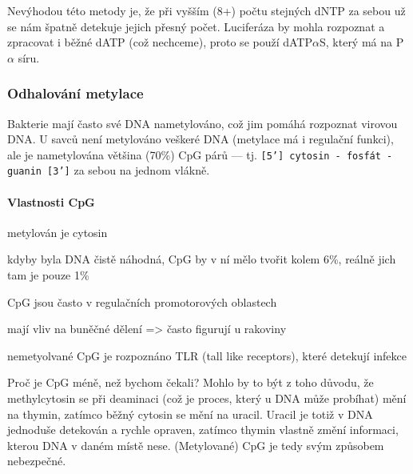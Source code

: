 \documentclass[DIV=8]{scrreprt}
\newcommand{\inlinecode}{\texttt}
\begin{document}
Nevýhodou této metody je, že při vyšším (8+) počtu stejných dNTP za sebou už se nám špatně detekuje jejich přesný počet. Luciferáza by mohla rozpoznat a zpracovat i běžné dATP (což nechceme), proto se použí dATP\(\alpha\)S, který má na P\(\alpha\) síru.

\subsubsection{Odhalování metylace} \label{Odhalování metylace}


Bakterie mají často své DNA nametylováno, což jim pomáhá rozpoznat virovou DNA. U savců není metylováno veškeré DNA (metylace má i regulační funkci), ale je nametylována většina (70\%) CpG párů --- tj. \inlinecode{[5'] cytosin - fosfát - guanin [3']} za sebou na jednom vlákně.

\paragraph{Vlastnosti CpG}
\begin{myItemize}[nosep]
    \item metylován je cytosin
    \item kdyby byla DNA čistě náhodná, CpG by v ní mělo tvořit kolem 6\%, reálně jich tam je pouze 1\%
    \item CpG jsou často v regulačních promotorových oblastech
\begin{myItemize}[nosep]
    \item mají vliv na buněčné dělení => často figurují u rakoviny
\end{myItemize}

    \item nemetyolvané CpG je rozpoznáno TLR (tall like receptors), které detekují infekce
\end{myItemize}



Proč je CpG méně, než bychom čekali? Mohlo by to být z toho důvodu, že methylcytosin se při deaminaci (což je proces, který u DNA může probíhat) mění na thymin, zatímco běžný cytosin se mění na uracil. Uracil je totiž v DNA jednoduše detekován a rychle opraven, zatímco thymin vlastně změní informaci, kterou DNA v daném místě nese. (Metylované) CpG je tedy svým způsobem nebezpečné.
\end{document}
